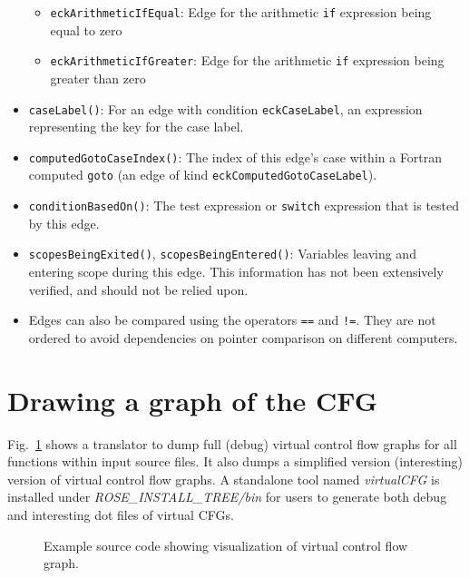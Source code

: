 \begin{itemize}
\begin{itemize}
  \item \lstinline{eckArithmeticIfEqual}: Edge for the arithmetic \lstinline{if} expression being equal to zero
  \item \lstinline{eckArithmeticIfGreater}: Edge for the arithmetic \lstinline{if} expression being greater than zero
  \end{itemize}
\item \lstinline{caseLabel()}: For an edge with condition
      \lstinline{eckCaseLabel}, an expression representing the key for the case
      label.
\item \lstinline{computedGotoCaseIndex()}: The index of this edge's case
      within a Fortran computed \lstinline{goto} (an edge of kind
      \lstinline{eckComputedGotoCaseLabel}).
\item \lstinline{conditionBasedOn()}: The test expression or
      \lstinline{switch} expression that is tested by this edge.
\item \lstinline{scopesBeingExited()}, \lstinline{scopesBeingEntered()}:
      Variables leaving and entering scope during this edge.  This information
      has not been extensively verified, and should not be relied upon.
\item Edges can also be compared using the operators \lstinline{==} and
      \lstinline{!=}.  They are not ordered to avoid dependencies on pointer
      comparison on different computers.
\end{itemize}

\section{Drawing a graph of the CFG}

Fig.~\ref{Tutorial:BuildVirtualCFG1} shows a translator to dump 
full (debug) virtual control flow graphs for all functions within input
source files. It also dumps a simplified version (interesting) version of 
virtual control flow graphs. A standalone tool named \textit{virtualCFG} is
installed under \textit{ROSE\_INSTALL\_TREE/bin} for users to generate both
debug and interesting dot files of virtual CFGs. 

\begin{figure}%
{\indent
  {\mySmallFontSize
    \begin{latexonly}
    
    \end{latexonly}

    \begin{htmlonly}
    
    \end{htmlonly}

  }
}
\label{Tutorial:BuildVirtualCFG1}
\caption{Example source code showing visualization of virtual control flow graph.}
\end{figure}



